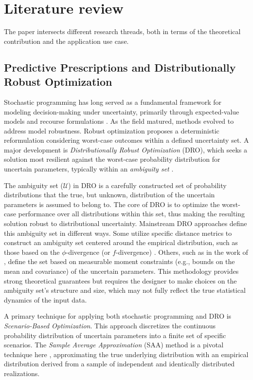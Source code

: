\documentclass{itor}
\begin{document}
\section{Literature review} \label{Sec:literature}

The paper intersects different research threads, both in terms of the theoretical contribution and the application use case.

\subsection{Predictive Prescriptions and Distributionally Robust Optimization}

Stochastic programming has long served as a fundamental framework for modeling decision-making under uncertainty, primarily through expected-value models and recourse formulations \citep{D55,B55}. As the field matured, methods evolved to address model robustness. Robust optimization \citep{BN98,BS04} proposes a deterministic reformulation considering worst-case outcomes within a defined uncertainty set. A major development is {\it Distributionally Robust Optimization} (DRO), which seeks a solution most resilient against the worst-case probability distribution for uncertain parameters, typically within an {\it ambiguity set} \citep{DY10}.

The ambiguity set ($\mathcal{U}$) in DRO is a carefully constructed set of probability distributions that the true, but unknown, distribution of the uncertain parameters is assumed to belong to. The core of DRO is to optimize the worst-case performance over all distributions within this set, thus making the resulting solution robust to distributional uncertainty. Mainstream DRO approaches define this ambiguity set in different ways. Some utilize specific distance metrics to construct an ambiguity set centered around the empirical distribution, such as those based on the $\phi$-divergence (or $f$-divergence) \citep{BK19}. Others, such as in the work of \citet{EK17}, define the set based on measurable moment constraints (e.g., bounds on the mean and covariance) of the uncertain parameters. This methodology provides strong theoretical guarantees but requires the designer to make choices on the ambiguity set's structure and size, which may not fully reflect the true statistical dynamics of the input data.

A primary technique for applying both stochastic programming and DRO is {\it Scenario-Based Optimization}. This approach discretizes the continuous probability distribution of uncertain parameters into a finite set of specific scenarios. The {\it Sample Average Approximation} (SAA) method is a pivotal technique here \citep{SH98}, approximating the true underlying distribution with an empirical distribution derived from a sample of independent and identically distributed realizations.
\end{document}
